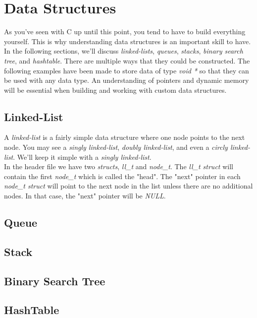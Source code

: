 \documentclass[../main.tex]{subfiles}
\begin{document}
	\chapter{Data Structures}
	As you've seen with C up until this point, you tend to have to build everything yourself.  This is why understanding data structures is an important skill to have.  In the following sections, we'll discuss \textit{linked-lists}, \textit{queues}, \textit{stacks}, \textit{binary search tree}, and \textit{hashtable}.  There are multiple ways that they could be constructed.  The following examples have been made to store data of type \textit{void *} so that they can be used with any data type.  An understanding of pointers and dynamic memory will be essential when building and working with custom data structures.
	
	\section{Linked-List}
	A \textit{linked-list} is a fairly simple data structure where one node points to the next node.  You may see a \textit{singly linked-list}, \textit{doubly linked-list}, and even a \textit{circly linked-list}.  We'll keep it simple with a \textit{singly linked-list}.\\
	
	
	In the header file we have two \textit{structs}, \textit{ll\_t} and \textit{node\_t}.  The \textit{ll\_t struct} will contain the first \textit{node\_t} which is called the "head".  The "next" pointer in each \textit{node\_t struct} will point to the next node in the list unless there are no additional nodes.  In that case, the "next" pointer will be \textit{NULL}.
	
	
	
	\section{Queue}
	
	
	
	
	\section{Stack}
	
	
	
	
	\section{Binary Search Tree}
	
	\section{HashTable}
	
\end{document}
